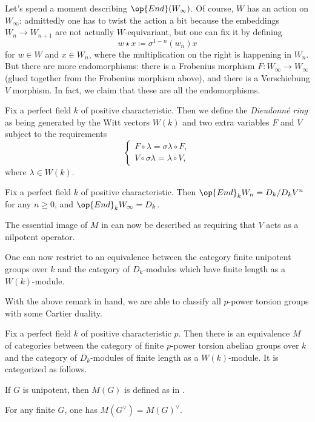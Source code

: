 \documentclass[../notes.tex]{subfiles}
\begin{document}
Let's spend a moment describing $\op{End}(W_\infty)$. Of course, $W$ has an action on $W_\infty$: admittedly one has to twist the action a bit because the embeddings $W_n\to W_{n+1}$ are not actually $W$-equivariant, but one can fix it by defining
\[w\star x\coloneqq \sigma^{1-n}(w_n)x\]
for $w\in W$ and $x\in W_n$, where the multiplication on the right is happening in $W_n$. But there are more endomorphisms: there is a Frobenius morphism $F\colon W_\infty\to W_\infty$ (glued together from the Frobenius morphism above), and there is a Verschiebung $V$ morphism. In fact, we claim that these are all the endomorphisms.
\begin{definition}
	Fix a perfect field $k$ of positive characteristic. Then we define the \textit{Dieudonn\'e ring} as being generated by the Witt vectors $W(k)$ and two extra variables $F$ and $V$ subject to the requirements
	\[\begin{cases}
		F\circ\lambda = \sigma\lambda\circ F, \\
		V\circ\sigma\lambda = \lambda\circ V,
	\end{cases}\]
	where $\lambda\in W(k)$.
\end{definition}
\begin{lemma}
	Fix a perfect field $k$ of positive characteristic. Then $\op{End}_kW_n=D_k/D_kV^n$ for any $n\ge0$, and $\op{End}_kW_\infty=D_k$.
\end{lemma}
\begin{remark}
	The essential image of $M$ in  can now be described as requiring that $V$ acts as a nilpotent operator.
\end{remark}
\begin{remark}
	One can now restrict  to an equivalence between the category finite unipotent groups over $k$ and the category of $D_k$-modules which have finite length as a $W(k)$-module.
\end{remark}
With the above remark in hand, we are able to classify all $p$-power torsion groups with some Cartier duality.
\begin{theorem}
	Fix a perfect field $k$ of positive characteristic $p$. Then there is an equivalence $M$ of categories between the category of finite $p$-power torsion abelian groups over $k$ and the category of $D_k$-modules of finite length as a $W(k)$-module. It is categorized as follows.
	\begin{listroman}
		\item If $G$ is unipotent, then $M(G)$ is defined as in .
		\item For any finite $G$, one has $M(G^\lor)=M(G)^\lor$.
	\end{listroman}
\end{theorem}
\end{document}

